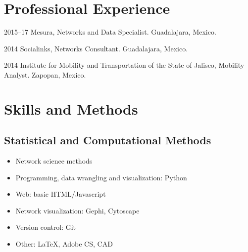 \documentclass{academiccv}
\begin{document}
\section*{Professional Experience}

\begin{tablist}
	
\item[2015--17] \tab Mesura, Networks and Data Specialist. Guadalajara, Mexico.

\item[2014] \tab Socialinks, Networks Consultant. Guadalajara, Mexico.

\item[2014] \tab Institute for Mobility and Transportation of the State of Jalisco, Mobility Analyst. Zapopan, Mexico.

\end{tablist}









\section*{Skills and Methods}

\subsection*{Statistical and Computational Methods}

\begin{itemize}
	
\item Network science methods
\item Programming, data wrangling and visualization: Python
\item Web: basic HTML/Javascript
\item Network visualization: Gephi, Cytoscape
\item Version control: Git
\item Other: \LaTeX, Adobe CS, CAD

\end{itemize}
\end{document}
